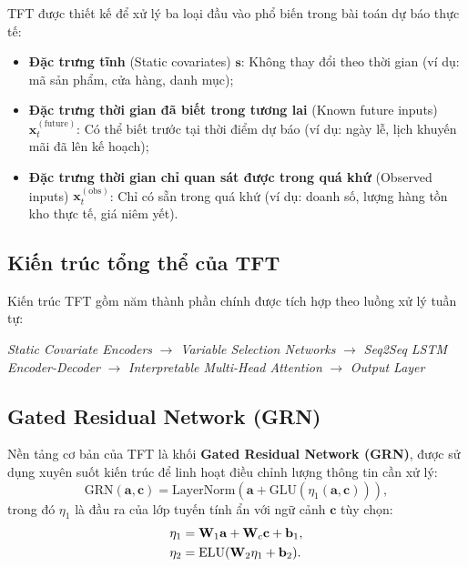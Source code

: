 TFT được thiết kế để xử lý ba loại đầu vào phổ biến trong bài toán dự báo thực tế:
\begin{itemize}
    \item \textbf{Đặc trưng tĩnh} (Static covariates) $\mathbf{s}$: Không thay đổi theo thời gian (ví dụ: mã sản phẩm, cửa hàng, danh mục);
    \item \textbf{Đặc trưng thời gian đã biết trong tương lai} (Known future inputs) $\mathbf{x}^{(\text{future})}_t$: Có thể biết trước tại thời điểm dự báo (ví dụ: ngày lễ, lịch khuyến mãi đã lên kế hoạch);
    \item \textbf{Đặc trưng thời gian chỉ quan sát được trong quá khứ} (Observed inputs) $\mathbf{x}^{(\text{obs})}_t$: Chỉ có sẵn trong quá khứ (ví dụ: doanh số, lượng hàng tồn kho thực tế, giá niêm yết).
\end{itemize}

\subsection{Kiến trúc tổng thể của TFT}
\label{subsec:tft_kien_truc}

Kiến trúc TFT gồm năm thành phần chính được tích hợp theo luồng xử lý tuần tự:

\begin{center}
\textit{Static Covariate Encoders} $\rightarrow$ \textit{Variable Selection Networks} $\rightarrow$ \textit{Seq2Seq LSTM Encoder-Decoder} $\rightarrow$ \textit{Interpretable Multi-Head Attention} $\rightarrow$ \textit{Output Layer}
\end{center}

\subsection{Gated Residual Network (GRN)}
\label{subsec:grn}

Nền tảng cơ bản của TFT là khối \textbf{Gated Residual Network (GRN)}, được sử dụng xuyên suốt kiến trúc để linh hoạt điều chỉnh lượng thông tin cần xử lý:
\begin{equation}
    \text{GRN}(\mathbf{a}, \mathbf{c}) = \text{LayerNorm}\!\left(\mathbf{a} + \text{GLU}\!\left(\eta_1(\mathbf{a}, \mathbf{c})\right)\right),
    \label{eq:grn}
\end{equation}
trong đó $\eta_1$ là đầu ra của lớp tuyến tính ẩn với ngữ cảnh $\mathbf{c}$ tùy chọn:
\begin{align}
    \eta_1 &= \mathbf{W}_1 \mathbf{a} + \mathbf{W}_c \mathbf{c} + \mathbf{b}_1, \notag \\
    \eta_2 &= \text{ELU}(\mathbf{W}_2 \eta_1 + \mathbf{b}_2). \notag
\end{align}

